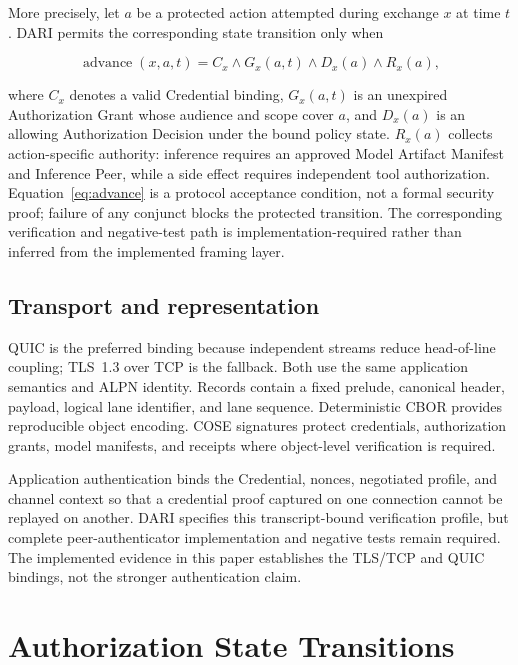 \documentclass[10pt]{article}
\begin{document}
More precisely, let $a$ be a protected action attempted during exchange $x$ at time $t$. DARI permits the corresponding state transition only when

\begin{equation}
\operatorname{advance}(x,a,t) = C_x \land G_x(a,t)
  \land D_x(a) \land R_x(a),
\label{eq:advance}
\end{equation}

where $C_x$ denotes a valid Credential binding, $G_x(a,t)$ is an unexpired Authorization Grant whose audience and scope cover $a$, and $D_x(a)$ is an allowing Authorization Decision under the bound policy state. $R_x(a)$ collects action-specific authority: inference requires an approved Model Artifact Manifest and Inference Peer, while a side effect requires independent tool authorization. Equation~\ref{eq:advance} is a protocol acceptance condition, not a formal security proof; failure of any conjunct blocks the protected transition. The corresponding verification and negative-test path is implementation-required rather than inferred from the implemented framing layer.

\subsection{Transport and representation}

QUIC is the preferred binding because independent streams reduce head-of-line coupling; TLS~1.3 over TCP is the fallback. Both use the same application semantics and ALPN identity. Records contain a fixed prelude, canonical header, payload, logical lane identifier, and lane sequence. Deterministic CBOR provides reproducible object encoding. COSE signatures protect credentials, authorization grants, model manifests, and receipts where object-level verification is required.

Application authentication binds the Credential, nonces, negotiated profile, and channel context so that a credential proof captured on one connection cannot be replayed on another. DARI specifies this transcript-bound verification profile, but complete peer-authenticator implementation and negative tests remain required. The implemented evidence in this paper establishes the TLS/TCP and QUIC bindings, not the stronger authentication claim.

\section{Authorization State Transitions}
\end{document}

